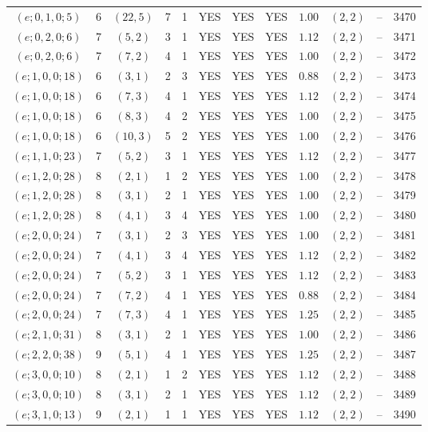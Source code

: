 \begin{longtable}{|c|c|c|c|c|c|c|c|c|c|c|c|}
$(e;0,1,0;5)$ & 6 & $(22,5)$ & 7 & 1 & YES & YES & YES & $1.00$ & $(2,2)$ & -- & 3470\\
$(e;0,2,0;6)$ & 7 & $(5,2)$ & 3 & 1 & YES & YES & YES & $1.12$ & $(2,2)$ & -- & 3471\\
$(e;0,2,0;6)$ & 7 & $(7,2)$ & 4 & 1 & YES & YES & YES & $1.00$ & $(2,2)$ & -- & 3472\\
$(e;1,0,0;18)$ & 6 & $(3,1)$ & 2 & 3 & YES & YES & YES & $0.88$ & $(2,2)$ & -- & 3473\\
$(e;1,0,0;18)$ & 6 & $(7,3)$ & 4 & 1 & YES & YES & YES & $1.12$ & $(2,2)$ & -- & 3474\\
$(e;1,0,0;18)$ & 6 & $(8,3)$ & 4 & 2 & YES & YES & YES & $1.00$ & $(2,2)$ & -- & 3475\\
$(e;1,0,0;18)$ & 6 & $(10,3)$ & 5 & 2 & YES & YES & YES & $1.00$ & $(2,2)$ & -- & 3476\\
$(e;1,1,0;23)$ & 7 & $(5,2)$ & 3 & 1 & YES & YES & YES & $1.12$ & $(2,2)$ & -- & 3477\\
$(e;1,2,0;28)$ & 8 & $(2,1)$ & 1 & 2 & YES & YES & YES & $1.00$ & $(2,2)$ & -- & 3478\\
$(e;1,2,0;28)$ & 8 & $(3,1)$ & 2 & 1 & YES & YES & YES & $1.00$ & $(2,2)$ & -- & 3479\\
$(e;1,2,0;28)$ & 8 & $(4,1)$ & 3 & 4 & YES & YES & YES & $1.00$ & $(2,2)$ & -- & 3480\\
$(e;2,0,0;24)$ & 7 & $(3,1)$ & 2 & 3 & YES & YES & YES & $1.00$ & $(2,2)$ & -- & 3481\\
$(e;2,0,0;24)$ & 7 & $(4,1)$ & 3 & 4 & YES & YES & YES & $1.12$ & $(2,2)$ & -- & 3482\\
$(e;2,0,0;24)$ & 7 & $(5,2)$ & 3 & 1 & YES & YES & YES & $1.12$ & $(2,2)$ & -- & 3483\\
$(e;2,0,0;24)$ & 7 & $(7,2)$ & 4 & 1 & YES & YES & YES & $0.88$ & $(2,2)$ & -- & 3484\\
$(e;2,0,0;24)$ & 7 & $(7,3)$ & 4 & 1 & YES & YES & YES & $1.25$ & $(2,2)$ & -- & 3485\\
$(e;2,1,0;31)$ & 8 & $(3,1)$ & 2 & 1 & YES & YES & YES & $1.00$ & $(2,2)$ & -- & 3486\\
$(e;2,2,0;38)$ & 9 & $(5,1)$ & 4 & 1 & YES & YES & YES & $1.25$ & $(2,2)$ & -- & 3487\\
$(e;3,0,0;10)$ & 8 & $(2,1)$ & 1 & 2 & YES & YES & YES & $1.12$ & $(2,2)$ & -- & 3488\\
$(e;3,0,0;10)$ & 8 & $(3,1)$ & 2 & 1 & YES & YES & YES & $1.12$ & $(2,2)$ & -- & 3489\\
$(e;3,1,0;13)$ & 9 & $(2,1)$ & 1 & 1 & YES & YES & YES & $1.12$ & $(2,2)$ & -- & 3490\\

\end{longtable}
